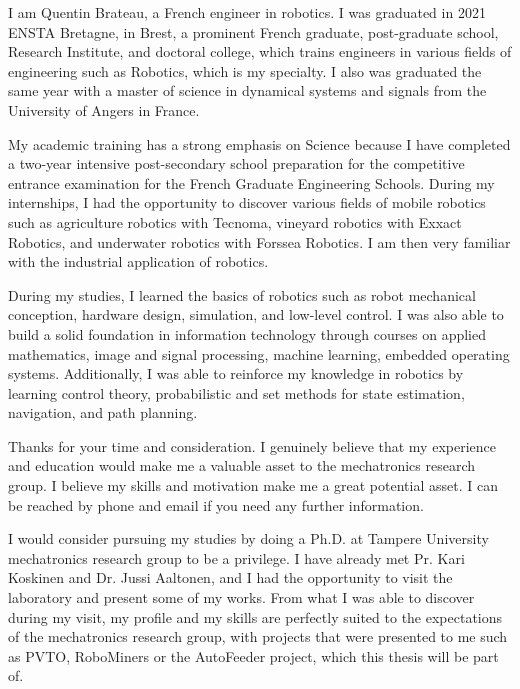 \documentclass[11pt, a4paper]{awesome-cv}
\begin{document}
	\makecvheader[C]


	\makelettertitle

	\begin{cvletter}

		I am Quentin Brateau, a French engineer in robotics. I was graduated in 2021 ENSTA Bretagne, in Brest, a prominent French graduate, post-graduate school, Research Institute, and doctoral college, which trains engineers in various fields of engineering such as Robotics, which is my specialty. I also was graduated the same year with a master of science in dynamical systems and signals from the University of Angers in France.

		My academic training has a strong emphasis on Science because I have completed a two-year intensive post-secondary school preparation for the competitive entrance examination for the French Graduate Engineering Schools. During my internships, I had the opportunity to discover various fields of mobile robotics such as agriculture robotics with Tecnoma, vineyard robotics with Exxact Robotics, and underwater robotics with Forssea Robotics. I am then very familiar with the industrial application of robotics.

		During my studies, I learned the basics of robotics such as robot mechanical conception, hardware design, simulation, and low-level control. I was also able to build a solid foundation in information technology through courses on applied mathematics, image and signal processing, machine learning, embedded operating systems. Additionally, I was able to reinforce my knowledge in robotics by learning control theory, probabilistic and set methods for state estimation, navigation, and path planning.

		Thanks for your time and consideration. I genuinely believe that my experience and education would make me a valuable asset to the mechatronics research group. I believe my skills and motivation make me a great potential asset. I can be reached by phone and email if you need any further information.

		
			I would consider pursuing my studies by doing a Ph.D. at Tampere University mechatronics research group to be a privilege. I have already met Pr. Kari Koskinen and Dr. Jussi Aaltonen, and I had the opportunity to visit the laboratory and present some of my works. From what I was able to discover during my visit, my profile and my skills are perfectly suited to the expectations of the mechatronics research group, with projects that were presented to me such as PVTO, RoboMiners or the AutoFeeder project, which this thesis will be part of.
			

\end{cvletter}
\end{document}
